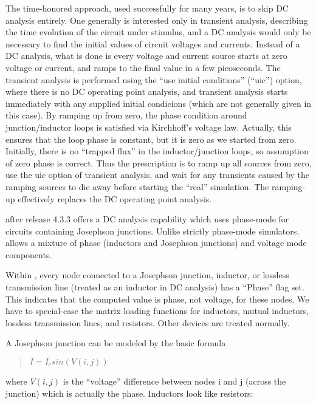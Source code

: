 The time-honored approach, used successfully for many years, is to
skip DC analysis entirely.  One generally is interested only in
transient analysis, describing the time evolution of the circuit under
stimulus, and a DC analysis would only be necessary to find the
initial values of circuit voltages and currents.  Instead of a DC
analysis, what is done is every voltage and current source starts at
zero voltage or current, and ramps to the final value in a few
picoseconds.  The transient analysis is performed using the ``use
initial conditions'' (``{\vt uic}'') option, where there is no DC
operating point analysis, and transient analysis starts immediately
with any supplied initial condicions (which are not generally given in
this case).  By ramping up from zero, the phase condition around
junction/inductor loops is satisfied via Kirchhoff's voltage law. 
Actually, this ensures that the loop phase is constant, but it is zero
as we started from zero.  Initially, there is no ``trapped flux'' in
the inductor/junction loops, so assumption of zero phase is correct. 
Thus the prescription is to ramp up all sources from zero, use the
{\vt uic} option of transient analysis, and wait for any transients
caused by the ramping sources to die away before starting the ``real''
simulation.  The ramping-up effectively replaces the DC operating
point analysis.

{\WRspice} after release 4.3.3 offers a DC analysis capability which
uses phase-mode for circuits containing Josephson junctions.  Unlike
strictly phase-mode simulators, {\WRspice} allows a mixture of phase
(inductors and Josephson junctions) and voltage mode components.

Within {\WRspice}, every node connected to a Josephson junction,
inductor, or lossless transmission line (treated as an inductor in DC
analysis) has a ``Phase'' flag set.  This indicates that the computed
value is phase, not voltage, for these nodes.  We have to special-case
the matrix loading functions for inductors, mutual inductors, lossless
transmission lines, and resistors.  Other devices are treated
normally.

A Josephson junction can be modeled by the basic formula

\begin{quote}
$I = I_c sin(V(i,j))$
\end{quote}

where $V(i,j)$ is the ``voltage'' difference between nodes i and j
(across the junction) which is actually the phase.  Inductors look
like resistors:

